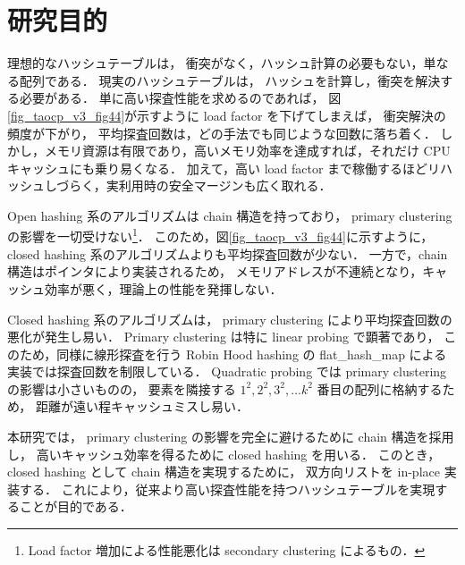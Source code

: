 \section{研究目的}
理想的なハッシュテーブルは，
衝突がなく，ハッシュ計算の必要もない，単なる配列である．
現実のハッシュテーブルは，
ハッシュを計算し，衝突を解決する必要がある．
単に高い探査性能を求めるのであれば，
図\ref{fig_taocp_v3_fig44}が示すように load factor を下げてしまえば，
衝突解決の頻度が下がり，
平均探査回数は，どの手法でも同じような回数に落ち着く．
しかし，メモリ資源は有限であり，高いメモリ効率を達成すれば，それだけ CPU キャッシュにも乗り易くなる．
加えて，高い load factor まで稼働するほどリハッシュしづらく，実利用時の安全マージンも広く取れる．

Open hashing 系のアルゴリズムは chain 構造を持っており，
primary clustering の影響を一切受けない\footnote{Load factor 増加による性能悪化は secondary clustering によるもの．}．
このため，図\ref{fig_taocp_v3_fig44}に示すように，
closed hashing 系のアルゴリズムよりも平均探査回数が少ない．
一方で，chain 構造はポインタにより実装されるため，
メモリアドレスが不連続となり，キャッシュ効率が悪く，理論上の性能を発揮しない．

Closed hashing 系のアルゴリズムは，
primary clustering により平均探査回数の悪化が発生し易い．
Primary clustering は特に linear probing で顕著であり，
このため，同様に線形探査を行う Robin Hood hashing の flat\_hash\_map による実装では探査回数を制限している．
Quadratic probing では primary clustering の影響は小さいものの，
要素を隣接する $1^2, 2^2, 3^2, ... k^2$ 番目の配列に格納するため，
距離が遠い程キャッシュミスし易い．

本研究では，
primary clustering の影響を完全に避けるために chain 構造を採用し，
高いキャッシュ効率を得るために closed hashing を用いる．
このとき，closed hashing として chain 構造を実現するために，
双方向リストを in-place 実装する．
これにより，従来より高い探査性能を持つハッシュテーブルを実現することが目的である．



